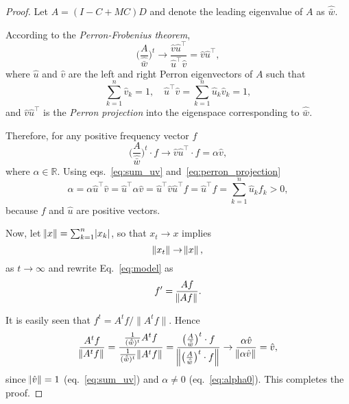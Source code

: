 \documentclass[9pt, a4paper, twocolumn]{extarticle}
\newcommand*{\tr}{^\intercal}
\newcommand{\goesto}{\rightarrow}
\begin{document}
\begin{proof}
Let $A=(I-C+MC)D$ and denote the leading eigenvalue of $A$ as $\hat{\bar w}$.

According to the \emph{Perron-Frobenius theorem}, 
\begin{equation}
\bigg(\frac{A}{\hat{\bar w}}\bigg)^t \goesto \frac{\hat v \hat u\tr}{\hat u\tr \hat v} = \hat v \hat u\tr,
\end{equation}
where $\hat u$ and $\hat v$ are the left and right Perron eigenvectors of $A$ such that 
\begin{equation}
\sum_{k=1}^{n}{\hat v_k}=1, \quad
\hat u\tr \hat v=\sum_{k=1}^{n}{\hat u_k \hat v_k}=1,
\label{eq:sum_uv}
\end{equation}
and $\hat v \hat u\tr$ is the \emph{Perron projection} into the eigenspace corresponding to $\hat{\bar w}$.

Therefore, for any positive frequency vector $f$
\begin{equation}
\bigg(\frac{A}{\hat{\bar w}}\bigg)^t \cdot f \goesto \hat v \hat u\tr \cdot f = \alpha \hat v,
\label{eq:perron_projection}
\end{equation}
where $\alpha \in \mathbb{R}$.
Using eqs.~\ref{eq:sum_uv} and~\ref{eq:perron_projection}
\begin{equation}
\alpha = \alpha \hat u\tr \hat v = \hat u\tr \alpha \hat v = \hat u\tr \hat v \hat u\tr f = \hat u\tr f = \sum_{k=1}^{n}{\hat u_k f_k} > 0,
\label{eq:alpha0}
\end{equation}
because $f$ and $\hat u$ are positive vectors.

Now, let $\norm{x} = \sum_{k=1}^{n}\abs{x_k}$, so that $x_t \goesto x$ implies
\begin{equation}
\norm{x_t} \goesto \norm{x},
\label{eq:norm_limit}
\end{equation}
as $t \goesto \infty$ and rewrite Eq.~\ref{eq:model} as 
\begin{equation}
f' = \frac{A f}{\norm{A f}}. 
\label{eq:model_norm}
\end{equation}

It is easily seen that $f^t =A^tf/\|A^tf\|$. Hence 
\begin{multline}
\frac{A^t f}{\norm{A^t f}} = 
\frac{\frac{1}{(\hat{\bar w})^t} A^t f}{\frac{1}{(\hat{\bar w})^t} \norm{A^t f}} = 
\frac{\big(\frac{A}{\hat{\bar w}}\big)^t \cdot f }{ \norm{ \big(\frac{A}{\hat{\bar w}}\big)^t \cdot f }} \goesto
\frac{\alpha \hat v}{\norm{\alpha \hat v}} = \hat v,
\end{multline}
since $\norm{\hat v}=1$ (eq.~\ref{eq:sum_uv}) and $\alpha \ne 0$ (eq.~\ref{eq:alpha0}).
This completes the proof.
\end{proof}
\end{document}
